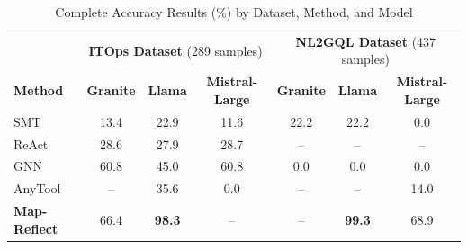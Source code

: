 \begin{table}[htbp]
\centering
\caption{Complete Accuracy Results (\%) by Dataset, Method, and Model}
\label{tab:complete_results}
\begin{tabular}{l|ccc|ccc}
\toprule
& \multicolumn{3}{c|}{\textbf{ITOps Dataset} (289 samples)} & \multicolumn{3}{c}{\textbf{NL2GQL Dataset} (437 samples)} \\
\textbf{Method} & \textbf{Granite} & \textbf{Llama} & \textbf{Mistral-Large} & \textbf{Granite} & \textbf{Llama} & \textbf{Mistral-Large} \\
\midrule
SMT & 13.4 & 22.9 & 11.6 & 22.2 & 22.2 & 0.0 \\
ReAct & 28.6 & 27.9 & 28.7 & -- & -- & -- \\
GNN & 60.8 & 45.0 & 60.8 & 0.0 & 0.0 & 0.0 \\
AnyTool & -- & 35.6 & 0.0 & -- & -- & 14.0 \\
\textbf{Map-Reflect} & 66.4 & \textbf{98.3} & -- & -- & \textbf{99.3} & 68.9 \\
\bottomrule
\end{tabular}
\end{table}

%
%
%
%
%
%

